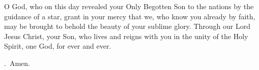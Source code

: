 \lettrine[lines=3]{O}{} God, who on this day
revealed your Only Begotten Son to the nations
by the guidance of a star,
grant in your mercy
that we, who know you already by faith,
may be brought to behold the beauty of your sublime glory.
Through our Lord Jesus Christ, your Son,
who lives and reigns with you in the unity of the Holy Spirit,
one God, for ever and ever. \par \Rbar.~Amen. 
